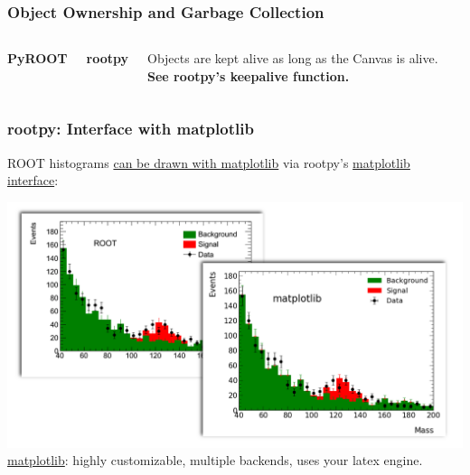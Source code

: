 \documentclass[10pt,professionalfonts,serif,usenames,dvipsnames,svgnames,table]{beamer}
\begin{document}
\begin{frame}[fragile]
    \frametitle{Object Ownership and Garbage Collection}
    \begin{columns}
        {\bf PyROOT}
    
        {\bf rootpy}
    
    Objects are kept alive as long as the Canvas is alive. \\
    {\bf See rootpy's keepalive function.}
    \end{columns}
\end{frame}

\begin{frame}
    \frametitle{rootpy: Interface with matplotlib}
    ROOT histograms
    \href{https://github.com/rootpy/rootpy/blob/master/examples/plotting/plot_matplotlib_hist.py}{
    can be drawn with matplotlib} via rootpy's
    \href{https://github.com/rootpy/rootpy/blob/master/rootpy/plotting/root2matplotlib.py}{
    matplotlib interface}:
    \begin{center}
    \includegraphics[width=.9\textwidth]{figs/examples/matplotlib_example.png}\\
    \href{http://matplotlib.org/gallery.html}{matplotlib}: highly customizable,
    multiple backends, uses your latex engine.
\end{center}
\end{frame}
\end{document}
